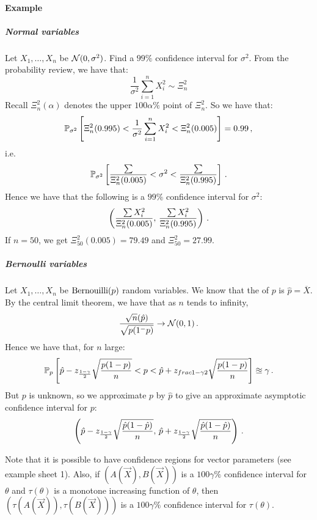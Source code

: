 \paragraph{Example}

\subparagraph{Normal variables}

Let $X_1, \dotsc, X_n$ be \iid $\mathcal{N}(0, \sigma^2)$. Find a $99\%$ confidence interval for $\sigma^2$.
From the probability review, we have that:
\[
\frac{1}{\sigma^2}\sum_{i=1}^n X_i^2 \sim \Xi^2_n
\]
Recall $\Xi^2_n(\alpha)$ denotes the upper $100\alpha\%$ point of $\Xi^2_n$.
So we have that:
\[
\mathbb{P}_{\sigma^2} \left[ \Xi^2_n(0.995) < \frac{1}{\sigma^2}\sum_{i=1}^n X_i^2 < \Xi^2_n(0.005) \right] = 0.99 \, {,}
\]
i.e.
\[
\mathbb{P}_{\sigma^2} \left[ \frac{\sum}{\Xi^2_n(0.005)} < \sigma^2 < \frac{\sum}{\Xi^2_n(0.995)} \right] \, {.}
\]
Hence we have that the following is a $99\%$ confidence interval for $\sigma^2$:
\[
\left(\frac{\sum X_i^2}{\Xi^2_n(0.005)}, \, \frac{\sum X_i^2}{\Xi^2_n(0.995)} \right) \, {.}
\]
If $n = 50$, we get $\Xi^2_{50}(0.005) = 79.49$ and $\Xi^2_{50} = 27.99$.

\subparagraph{Bernoulli variables}

Let $X_1, \dotsc, X_n$ be \iid $\text{Bernouilli}(p)$ random variables. We know that the \mle of $p$ is $\hat{p} = \overline{X}$.
By the central limit theorem, we have that as $n$ tends to infinity,
\[
\frac{\sqrt{n}(\hat{p})}{\sqrt{p(1^-p)}} \rightarrow \mathcal{N}(0, 1) \, {.}
\]
Hence we have that, for $n$ large:
\[
\mathbb{P}_p \left[ \hat{p} - z_{\frac{1-\gamma}{2}}\sqrt{\frac{p(1-p)}{n}} < p < \hat{p} + z_{frac{1-\gamma}{2}} \sqrt{\frac{p(1-p)}{n}} \right] \approxeq \gamma \, {.}
\]
But $p$ is unknown, so we approximate $p$ by $\hat{p}$ to give an approximate asymptotic confidence interval for $p$:
\[
\left( \hat{p} - z_{\frac{1-\gamma}{2}}\sqrt{\frac{\hat{p}(1-\hat{p})}{n}}, \, \hat{p} + z_{\frac{1-\gamma}{2}}\sqrt{\frac{\hat{p}(1-\hat{p})}{n}} \right) \, {.}
\]

Note that it is possible to have confidence regions for vector parameters (see example sheet 1). Also, if $\left(A(\vec{X}), B(\vec{X})\right)$ is a $100\gamma\%$ confidence interval for $\theta$ and $\tau(\theta)$ is a monotone increasing function of $\theta$, then $\left(\tau(A(\vec{X})), \tau(B(\vec{X}))\right)$ is a $100\gamma\%$ confidence interval for $\tau(\theta)$.



